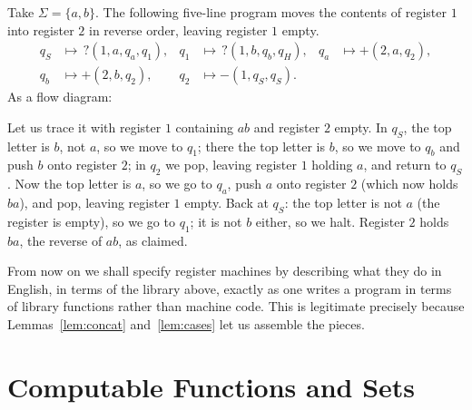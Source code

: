\begin{example}\label{ex:rmflow}
	Take $\Sigma = \{a,b\}$. The following five-line program moves the contents of register $1$ into register $2$ in reverse order, leaving register $1$ empty.
	\begin{align*}
		q_S &\mapsto\, ?(1,a,q_a,q_1), & q_1 &\mapsto\, ?(1,b,q_b,q_H), & q_a &\mapsto +(2,a,q_2), \\
		q_b &\mapsto +(2,b,q_2), & q_2 &\mapsto -(1,q_S,q_S). &&
	\end{align*}
	As a flow diagram:
	\begin{center}
	\end{center}
	Let us trace it with register $1$ containing $ab$ and register $2$ empty. In $q_S$, the top letter is $b$, not $a$, so we move to $q_1$; there the top letter is $b$, so we move to $q_b$ and push $b$ onto register $2$; in $q_2$ we pop, leaving register $1$ holding $a$, and return to $q_S$. Now the top letter is $a$, so we go to $q_a$, push $a$ onto register $2$ (which now holds $ba$), and pop, leaving register $1$ empty. Back at $q_S$: the top letter is not $a$ (the register is empty), so we go to $q_1$; it is not $b$ either, so we halt. Register $2$ holds $ba$, the reverse of $ab$, as claimed.
\end{example}

From now on we shall specify register machines by describing what they do in English, in terms of the library above, exactly as one writes a program in terms of library functions rather than machine code. This is legitimate precisely because Lemmas~\ref{lem:concat} and~\ref{lem:cases} let us assemble the pieces.

\section{Computable Functions and Sets}\label{sec:computable}


